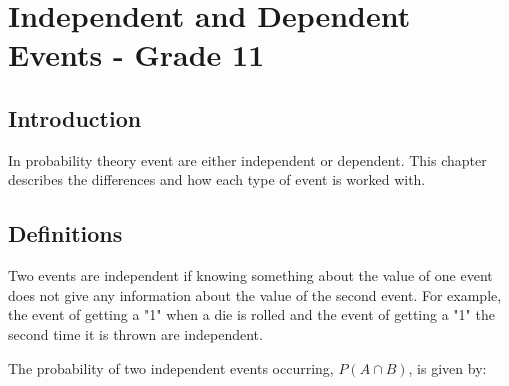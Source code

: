 \chapter{Independent and Dependent Events - Grade 11}
\label{m:p11}



\section{Introduction}
In probability theory event are either independent or dependent. This chapter describes the differences and how each type of event is worked with.

\section{Definitions}
Two events are independent if knowing something about the value of one event does not give any information about the value of the second event. For example, the event of getting a "1" when a die is rolled and the event of getting a "1" the second time it is thrown are independent.


The probability of two independent events occurring, $P(A \cap B)$, is given by:

